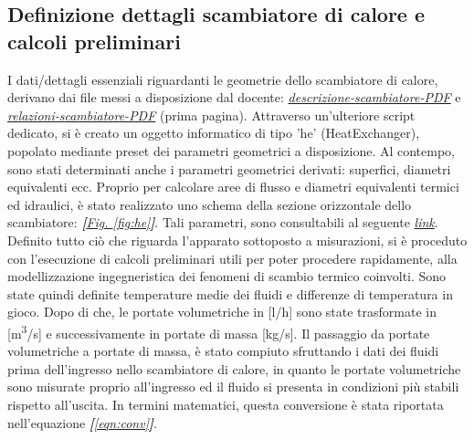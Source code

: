 \documentclass[a4paper,10pt]{article}                                                                                       %
\begin{document}
\subsection{Definizione dettagli scambiatore di calore e calcoli preliminari}                                               %
\label{subsec:hedef_precalcs}                                                                                               %
  I dati/dettagli essenziali riguardanti le geometrie dello scambiatore di calore, derivano dai file messi a disposizione
  dal docente:
  \textit{\href{https://github.com/CristianMerli/DataAnalysis/blob/master/lab_doc/DescrizioneScambiatore.pdf}{descrizione-scambiatore-PDF}}
  e \textit{\href{https://github.com/CristianMerli/DataAnalysis/blob/master/lab_doc/RelazioniScambiatore.pdf}{relazioni-scambiatore-PDF}}
  (prima pagina). Attraverso un'ulteriore script dedicato, si è creato un oggetto informatico di tipo 'he' (HeatExchanger),
  popolato mediante preset dei parametri geometrici a disposizione. Al contempo, sono stati determinati anche i parametri
  geometrici derivati: superfici, diametri equivalenti ecc. Proprio per calcolare aree di flusso e diametri equivalenti
  termici ed idraulici, è stato realizzato uno schema della sezione orizzontale dello scambiatore:
  \textit{\textbf{[}\hyperref[fig:he]{Fig. }\ref{fig:he}\textbf{]}}. Tali parametri, sono consultabili al seguente
  \textit{\href{https://github.com/CristianMerli/DataAnalysis/blob/master/final_doc/code_exports/output/he.txt}{link}}.
  Definito tutto ciò che riguarda l'apparato sottoposto a misurazioni, si è proceduto con l'esecuzione di calcoli
  preliminari utili per poter procedere rapidamente, alla modellizzazione ingegneristica dei fenomeni di scambio termico
  coinvolti. Sono state quindi definite temperature medie dei fluidi e differenze di temperatura in gioco. Dopo di che, le
  portate volumetriche in [l/h] sono state trasformate in [m\textsuperscript{3}/s] e successivamente in portate di massa
  [kg/s]. Il passaggio da portate volumetriche a portate di massa, è stato compiuto sfruttando i dati dei fluidi prima
  dell'ingresso nello scambiatore di calore, in quanto le portate volumetriche sono misurate proprio all'ingresso ed il
  fluido si presenta in condizioni più stabili rispetto all'uscita. In termini matematici, questa conversione è stata
  riportata nell'equazione
  \textit{\textbf{[}\ref{eqn:conv}\textbf{]}}.
\end{document}
